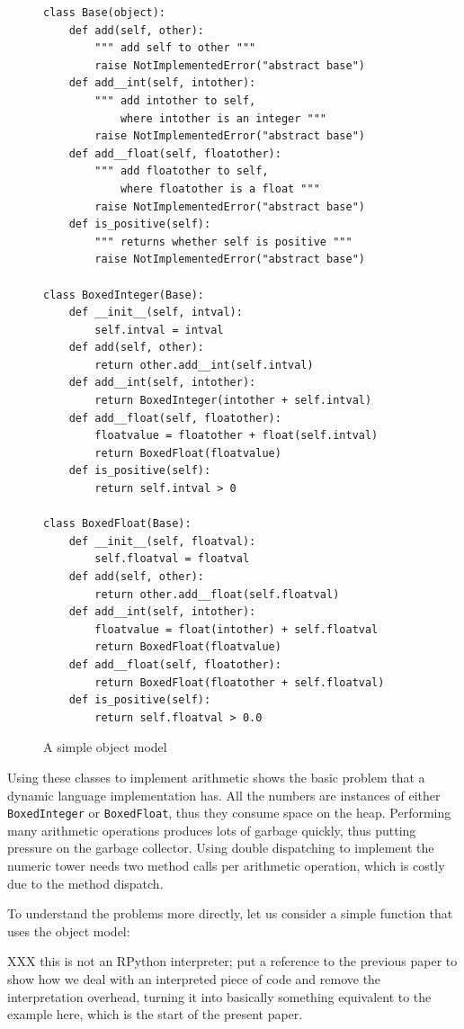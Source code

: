 \documentclass{sigplanconf}
\begin{document}
\begin{figure}
\begin{verbatim}
class Base(object):
    def add(self, other):
        """ add self to other """
        raise NotImplementedError("abstract base")
    def add__int(self, intother):
        """ add intother to self,
            where intother is an integer """
        raise NotImplementedError("abstract base")
    def add__float(self, floatother):
        """ add floatother to self,
            where floatother is a float """
        raise NotImplementedError("abstract base")
    def is_positive(self):
        """ returns whether self is positive """
        raise NotImplementedError("abstract base")

class BoxedInteger(Base):
    def __init__(self, intval):
        self.intval = intval
    def add(self, other):
        return other.add__int(self.intval)
    def add__int(self, intother):
        return BoxedInteger(intother + self.intval)
    def add__float(self, floatother):
        floatvalue = floatother + float(self.intval)
        return BoxedFloat(floatvalue)
    def is_positive(self):
        return self.intval > 0

class BoxedFloat(Base):
    def __init__(self, floatval):
        self.floatval = floatval
    def add(self, other):
        return other.add__float(self.floatval)
    def add__int(self, intother):
        floatvalue = float(intother) + self.floatval
        return BoxedFloat(floatvalue)
    def add__float(self, floatother):
        return BoxedFloat(floatother + self.floatval)
    def is_positive(self):
        return self.floatval > 0.0
\end{verbatim}
\caption{A simple object model}
\end{figure}

Using these classes to implement arithmetic shows the basic problem that a
dynamic language implementation has. All the numbers are instances of either
\texttt{BoxedInteger} or \texttt{BoxedFloat}, thus they consume space on the
heap. Performing many arithmetic operations produces lots of garbage quickly,
thus putting pressure on the garbage collector. Using double dispatching to
implement the numeric tower needs two method calls per arithmetic operation,
which is costly due to the method dispatch.

To understand the problems more directly, let us consider a simple function
that uses the object model:

XXX this is not an RPython interpreter; put a reference to the previous
paper to show how we deal with an interpreted piece of code and remove
the interpretation overhead, turning it into basically something
equivalent to the example here, which is the start of the present paper.
\end{document}
